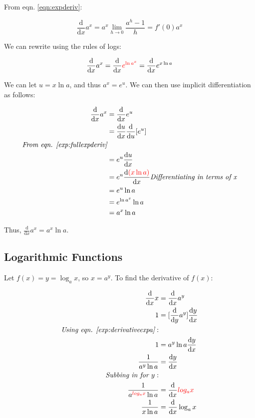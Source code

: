 \documentclass[12pt]{article}
\begin{document}
From eqn. \ref{eqn:expderiv}:

$$\frac{\text{d}}{\text{d}x}a^x = a^x \lim_{h\to 0} \frac{a^h-1}{h} = f'(0) a^x$$

We can rewrite using the rules of logs:

$$\frac{\text{d}}{\text{d}x}a^x = \frac{\text{d}}{\text{d}x}\textcolor{red}{ e^{\ln a^x} } = \frac{\text{d}}{\text{d}x} e^{x\ln a}$$

We can let $u = x \ln a$, and thus $a^x = e^u$. We can then use implicit differentiation as follows:

\begin{equation}\label{exp:derivativeexpa}
    \begin{split}
        \frac{\text{d}}{\text{d}x} a^x &= \frac{\text{d}}{\text{d}x} e^u\\
        &=\frac{\text{d}u}{\text{d}x} \frac{\text{d}}{\text{d}u} [e^u]\\
        \textit{From eqn. \ref{exp:fullexpderiv}}\\
        &=e^u \frac{\text{d}u}{\text{d}x}\\
        &= e^u \frac{\text{d} \textcolor{red}{(x \ln a)}}{\text{d}x}
        \textit{Differentiating in terms of x}\\
        &= e^u \ln a\\
        &= e^{\ln a^x} \ln a\\
        &= a^x \ln a\\
    \end{split}
\end{equation}

Thus, $\frac{\text{d}}{\text{d}x} a^x = a^x \ln a$.

\subsection{Logarithmic Functions}

Let $f(x) = y = \log_a{x}$, so $x = a^y$. To find the derivative of $f(x)$:

\begin{equation}
    \begin{split}
        \frac{\text{d}}{\text{d}x} x &= \frac{\text{d}}{\text{d}x} a^y\\
        1 &= [\frac{\text{d}}{\text{d}y} a^y] \frac{\text{d}y}{\text{d}x}\\
        \textit{Using eqn. \ref{exp:derivativeexpa}}:\\
        1 &= a^y \ln a \frac{\text{d}y}{\text{d}x}\\
        \frac{1}{a^y \ln a} &= \frac{\text{d}y}{\text{d}x}\\
        \textit{Subbing in for $y$}:\\
        \frac{1}{a^{\textcolor{red}{log_a{x}}} \ln a} &= \frac{\text{d}}{\text{d}x} \textcolor{red}{log_a{x}}\\
        \frac{1}{x \ln a} &= \frac{\text{d}}{\text{d}x} \log_a{x}
    \end{split}
\end{equation}
\end{document}
